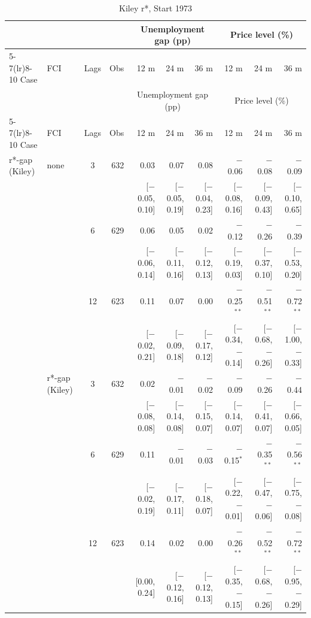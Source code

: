 \begingroup\scriptsize\setlength{\tabcolsep}{0.9pt}
\begin{longtable}{llcrrrrrrr}
\caption{Kiley r*, Start 1973}\label{tab:appR2a73}\\
\toprule
 & & & & \multicolumn{3}{c}{Unemployment gap (pp)} & \multicolumn{3}{c}{Price level (\%)}\\ \cmidrule(lr){5-7}\cmidrule(lr){8-10}
Case & FCI & Lags & Obs & 12 m & 24 m & 36 m & 12 m & 24 m & 36 m\\
\midrule\endfirsthead
\toprule
 & & & & \multicolumn{3}{c}{Unemployment gap (pp)} & \multicolumn{3}{c}{Price level (\%)}\\ \cmidrule(lr){5-7}\cmidrule(lr){8-10}
Case & FCI & Lags & Obs & 12 m & 24 m & 36 m & 12 m & 24 m & 36 m\\
\midrule\endhead
\bottomrule\endfoot
r*-gap (Kiley) & none & 3 & 632 & 0.03 & 0.07 & 0.08 & $-$0.06 & $-$0.08 & $-$0.09\\
 & & & & {\scriptsize [$-$0.05, 0.10]} & {\scriptsize [$-$0.05, 0.19]} & {\scriptsize [$-$0.04, 0.23]} & {\scriptsize [$-$0.08, 0.16]} & {\scriptsize [$-$0.09, 0.43]} & {\scriptsize [$-$0.10, 0.65]}\\
 &  & 6 & 629 & 0.06 & 0.05 & 0.02 & $-$0.12 & $-$0.26 & $-$0.39\\
 & & & & {\scriptsize [$-$0.06, 0.14]} & {\scriptsize [$-$0.11, 0.16]} & {\scriptsize [$-$0.12, 0.13]} & {\scriptsize [$-$0.19, 0.03]} & {\scriptsize [$-$0.37, 0.10]} & {\scriptsize [$-$0.53, 0.20]}\\
 &  & 12 & 623 & 0.11 & 0.07 & 0.00 & $-$0.25$^{**}$ & $-$0.51$^{**}$ & $-$0.72$^{**}$\\
 & & & & {\scriptsize [$-$0.02, 0.21]} & {\scriptsize [$-$0.09, 0.18]} & {\scriptsize [$-$0.17, 0.12]} & {\scriptsize [$-$0.34, $-$0.14]} & {\scriptsize [$-$0.68, $-$0.26]} & {\scriptsize [$-$1.00, $-$0.33]}\\
 & r*-gap (Kiley) & 3 & 632 & 0.02 & $-$0.01 & $-$0.02 & $-$0.09 & $-$0.26 & $-$0.44\\
 & & & & {\scriptsize [$-$0.08, 0.08]} & {\scriptsize [$-$0.14, 0.08]} & {\scriptsize [$-$0.15, 0.07]} & {\scriptsize [$-$0.14, 0.07]} & {\scriptsize [$-$0.41, 0.07]} & {\scriptsize [$-$0.66, 0.05]}\\
 &  & 6 & 629 & 0.11 & $-$0.01 & $-$0.03 & $-$0.15$^{*}$ & $-$0.35$^{**}$ & $-$0.56$^{**}$\\
 & & & & {\scriptsize [$-$0.02, 0.19]} & {\scriptsize [$-$0.17, 0.11]} & {\scriptsize [$-$0.18, 0.07]} & {\scriptsize [$-$0.22, $-$0.01]} & {\scriptsize [$-$0.47, $-$0.06]} & {\scriptsize [$-$0.75, $-$0.08]}\\
 &  & 12 & 623 & 0.14 & 0.02 & 0.00 & $-$0.26$^{**}$ & $-$0.52$^{**}$ & $-$0.72$^{**}$\\
 & & & & {\scriptsize [0.00, 0.24]} & {\scriptsize [$-$0.12, 0.16]} & {\scriptsize [$-$0.12, 0.13]} & {\scriptsize [$-$0.35, $-$0.15]} & {\scriptsize [$-$0.68, $-$0.26]} & {\scriptsize [$-$0.95, $-$0.29]}\\
\end{longtable}
